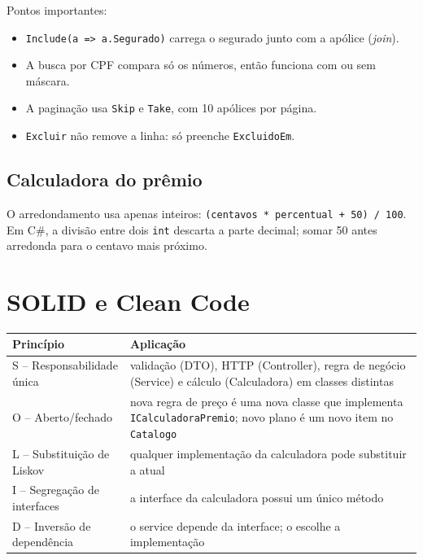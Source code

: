\documentclass[11pt,a4paper]{article}
\newcommand{\arq}[1]{\texttt{\detokenize{#1}}}
\newcommand{\codigo}[2]{}
\begin{document}
\codigo{CorisSeguros.Api/Services/ApoliceService.cs}{backend/CorisSeguros.Api/Services/ApoliceService.cs}

Pontos importantes:
\begin{itemize}
  \item \texttt{Include(a => a.Segurado)} carrega o segurado junto com a apólice (\emph{join}).
  \item A busca por CPF compara só os números, então funciona com ou sem máscara.
  \item A paginação usa \texttt{Skip} e \texttt{Take}, com 10 apólices por página.
  \item \texttt{Excluir} não remove a linha: só preenche \texttt{ExcluidoEm}.
\end{itemize}

\subsection{Calculadora do prêmio}

\codigo{CorisSeguros.Api/Services/ICalculadoraPremio.cs}{backend/CorisSeguros.Api/Services/ICalculadoraPremio.cs}
\codigo{CorisSeguros.Api/Services/CalculadoraPremio.cs}{backend/CorisSeguros.Api/Services/CalculadoraPremio.cs}

O arredondamento usa apenas inteiros: \texttt{(centavos * percentual + 50) / 100}. Em C\#, a divisão
entre dois \texttt{int} descarta a parte decimal; somar 50 antes arredonda para o centavo mais próximo.

\section{SOLID e Clean Code}

\begin{center}
\begin{tabularx}{\linewidth}{@{}lX@{}}
\toprule
Princípio & Aplicação \\
\midrule
S -- Responsabilidade única & validação (DTO), HTTP (Controller), regra de negócio (Service) e cálculo (Calculadora) em classes distintas \\
O -- Aberto/fechado & nova regra de preço é uma nova classe que implementa \texttt{ICalculadoraPremio}; novo plano é um novo item no \texttt{Catalogo} \\
L -- Substituição de Liskov & qualquer implementação da calculadora pode substituir a atual \\
I -- Segregação de interfaces & a interface da calculadora possui um único método \\
D -- Inversão de dependência & o service depende da interface; o \arq{Program.cs} escolhe a implementação \\
\bottomrule
\end{tabularx}
\end{center}
\end{document}
